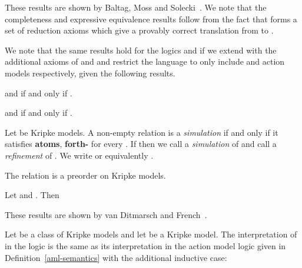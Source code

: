 \documentclass[twoside]{aiml14}
\begin{document}
  These results are shown by Baltag, Moss and Solecki~\cite{baltag1998,baltag2005}. 
  We note that the completeness and expressive equivalence results follow from
  the fact that \axiomAmlK{} forms a set of reduction axioms which give a
  provably correct translation from \langAml{} to \lang{}.

  We note that the same results hold for the logics \logicAmlKFF{} and
  \logicAmlS{} if we extend \axiomAmlK{} with the additional axioms of
  \axiomKFF{} and \axiomS{} and restrict the language to only include
   and  action models respectively, given
  the following results.

  \begin{proposition}\label{aml-kff-domain}
       and  if and only if .
  \end{proposition}

  \begin{proposition}\label{aml-s-domain}
       and  if and only if .
  \end{proposition}
  
  \begin{definition}\label{refinements}
      Let  be Kripke models.
      A non-empty relation 
      is a {\em simulation} if and only if it satisfies {\bf atoms}, {\bf forth-} for every .
      If  then we call  a {\em simulation} of 
      and call  a {\em refinement} of .
      We write 
      or equivalently .
  \end{definition}

  \begin{proposition}
      The relation  is a preorder on Kripke models.
  \end{proposition}

  \begin{proposition}
      Let  and .
      Then 
  \end{proposition}

  These results are shown by van Ditmarsch and French~\cite{vanditmarsch2009}.

  \begin{definition}
      Let \classC{} be a class of Kripke models 
      and let  be a Kripke model.
      The interpretation of  in the logic \logicAamlC{}
      is the same as its interpretation in the action model logic \logicAmlC{} given in
      Definition~\ref{aml-semantics} with the additional inductive case:
      
  \end{definition}
\end{document}
